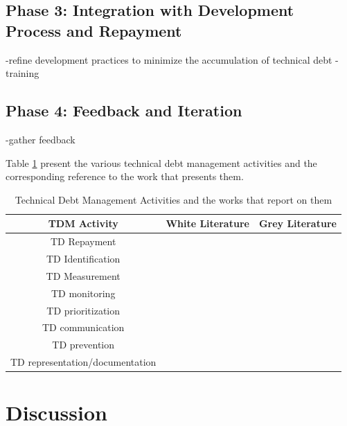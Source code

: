 \subsection{Phase 3: Integration with Development Process and Repayment}
-refine development practices to minimize the accumulation of technical debt
-training

\subsection{Phase 4: Feedback and Iteration}
-gather feedback

Table \ref{tab:TDMactivities} present the various technical debt management activities and the corresponding reference to the work that presents them.

\begin{table}[h!]

\centering
\begin{tabular}{|c|c|c|}
    \hline
    TDM Activity & White Literature & Grey Literature \\ \hline
    TD Repayment &~\cite{10.1145/3084226.3084248, 10.1145/3387906.3388623} &  \\ \hline
    TD Identification &~\cite{Klotins2018/3183519.3183539, CicoTradeoffs} & \\ \hline
    TD Measurement & &~\cite{Qualityv77:online, Whopayso60:online}\\ \hline
    TD monitoring &~\cite{Besker2018} & \\ \hline
 TD prioritization & ~\cite{9820390} &~\cite{techolut25:online, HowtoGet43:online}\\ \hline
TD communication & &~\cite{FowlerBottlenecks} \\ \hline
TD prevention &~\cite{SanchezGordon2016} &~\cite{Creating18:online}\\ \hline
TD representation/documentation &~\cite{Chicote:2017} & \\ \hline
    \end{tabular}

\caption{Technical Debt Management Activities and the works that report on them}
  \label{tab:TDMactivities}
\end{table}

\section{Discussion}\label{Sec:Discussion}



